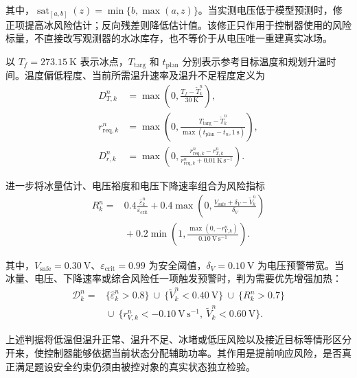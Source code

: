 \documentclass[bwprint]{gmcmthesis}
\numberwithin{figure}{section}
\begin{document}
其中，$\operatorname{sat}_{[a,b]}(z)=\min\{b,\max(a,z)\}$。当实测电压低于模型预测时，修正项提高冰风险估计；反向残差则降低估计值。该修正只作用于控制器使用的风险标量，不直接改写观测器的水冰库存，也不等价于从电压唯一重建真实冰场。

以 $T_f=273.15\ \mathrm K$ 表示冰点，$T_{\mathrm{targ}}$ 和 $t_{\mathrm{plan}}$ 分别表示参考目标温度和规划升温时间。温度偏低程度、当前所需温升速率及温升不足程度定义为
\begin{equation}
\begin{aligned}
D_{T,k}^n&=\max\!\left(0,\frac{T_f-\widetilde T_k^n}{30\ \mathrm K}\right),\\
r_{\mathrm{req},k}^n&=\max\!\left(0,\frac{T_{\mathrm{targ}}-\widetilde T_k^n}
{\max(t_{\mathrm{plan}}-t_n,1\ \mathrm s)}\right),\\
D_{r,k}^n&=\max\!\left(0,\frac{r_{\mathrm{req},k}^n-r_{T,k}^n}
{r_{\mathrm{req},k}^n+0.01\ \mathrm{K\,s^{-1}}}\right).
\end{aligned}
\tag{7-15}\label{eq:q4:temperature_deficit}
\end{equation}

进一步将冰量估计、电压裕度和电压下降速率组合为风险指标
\begin{equation}
\begin{aligned}
R_k^n={}&0.4\frac{\widehat\varepsilon_k^n}{\varepsilon_{\mathrm{crit}}}
+0.4\max\!\left(0,\frac{V_{\mathrm{safe}}+\delta_V-\widetilde V_k^n}{\delta_V}\right)
\\
&{}+0.2\min\!\left(1,\frac{\max(0,-r_{V,k}^n)}{0.10\ \mathrm{V\,s^{-1}}}\right).
\end{aligned}
\tag{7-16}\label{eq:q4:ice_risk}
\end{equation}

其中，$V_{\mathrm{safe}}=0.30\ \mathrm V$、$\varepsilon_{\mathrm{crit}}=0.99$ 为安全阈值，$\delta_V=0.10\ \mathrm V$ 为电压预警带宽。当冰量、电压、下降速率或综合风险任一项触发预警时，判为需要优先增强加热：
\begin{equation}
\begin{aligned}
\mathcal D_k^n={}&
\big\{\widehat\varepsilon_k^n>0.8\big\}
\ \cup\ \big\{\widetilde V_k^n<0.40\ \mathrm V\big\}
\ \cup\ \big\{R_k^n>0.7\big\}\\
&{}\cup\ \big\{r_{V,k}^n<-0.10\ \mathrm{V\,s^{-1}},\
\widetilde V_k^n<0.60\ \mathrm V\big\}.
\end{aligned}
\tag{7-17}\label{eq:q4:danger_condition}
\end{equation}

上述判据将低温但温升正常、温升不足、冰堵或低压风险以及接近目标等情形区分开来，使控制器能够依据当前状态分配辅助功率。其作用是提前响应风险，是否真正满足题设安全约束仍须由被控对象的真实状态独立检验。
\end{document}

